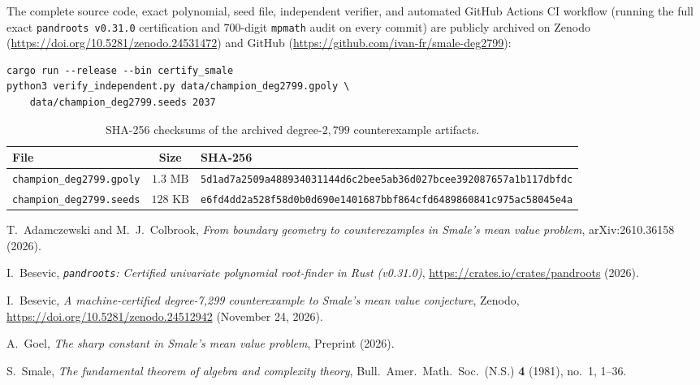 \documentclass[11pt,a4paper]{amsart}
\theoremstyle{remark}
\begin{document}
The complete source code, exact polynomial, seed file, independent verifier,
and automated GitHub Actions CI workflow (running the full exact
\texttt{pandroots v0.31.0} certification and $700$-digit \texttt{mpmath} audit
on every commit) are publicly archived on Zenodo
(\url{https://doi.org/10.5281/zenodo.24531472}) and GitHub
(\url{https://github.com/ivan-fr/smale-deg2799}):
\begin{verbatim}
cargo run --release --bin certify_smale
python3 verify_independent.py data/champion_deg2799.gpoly \
    data/champion_deg2799.seeds 2037
\end{verbatim}

\begin{table}[h]
\centering
\footnotesize
\setlength{\tabcolsep}{4pt}
\caption{SHA-256 checksums of the archived degree-$2{,}799$ counterexample artifacts.}
\begin{tabular}{@{}lcl@{}}
\toprule
File & Size & SHA-256 \\
\midrule
\texttt{champion\_deg2799.gpoly} & $1.3\text{ MB}$ & \texttt{\scriptsize 5d1ad7a2509a488934031144d6c2bee5ab36d027bcee392087657a1b117dbfdc} \\
\texttt{champion\_deg2799.seeds} & $128\text{ KB}$ & \texttt{\scriptsize e6fd4dd2a528f58d0b0d690e1401687bbf864cfd6489860841c975ac58045e4a} \\
\bottomrule
\end{tabular}
\end{table}

\begin{thebibliography}{9}

T.~Adamczewski and M.~J.~Colbrook,
\emph{From boundary geometry to counterexamples in Smale's mean value problem},
arXiv:2610.36158 (2026).

I.~Besevic,
\emph{\texttt{pandroots}: Certified univariate polynomial root-finder in Rust (v0.31.0)},
\url{https://crates.io/crates/pandroots} (2026).

I.~Besevic,
\emph{A machine-certified degree-7,299 counterexample to Smale's mean value conjecture},
Zenodo, \url{https://doi.org/10.5281/zenodo.24512942} (November 24, 2026).

A.~Goel,
\emph{The sharp constant in Smale's mean value problem},
Preprint (2026).

S.~Smale,
\emph{The fundamental theorem of algebra and complexity theory},
Bull.\ Amer.\ Math.\ Soc.\ (N.S.) \textbf{4} (1981), no.~1, 1--36.

\end{thebibliography}
\end{document}
